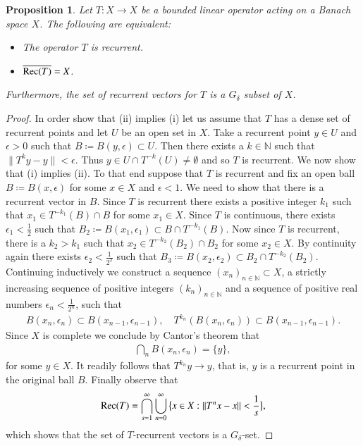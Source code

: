 \documentclass[12pt,leqno]{amsart}
\theoremstyle{plain}
\newtheorem{proposition}[equation]{Proposition}
\theoremstyle{definition}
\numberwithin{equation}{section}
\begin{document}
\begin{proposition}
	\label{p.dense} Let $T:X\to X$ be a bounded linear operator acting on a Banach space $X$. The following are equivalent: 
	\begin{itemize}
		\item [(i)] The operator $T$ is recurrent. 
		\item [(ii)] $\overline{{\textnormal{Rec}}(T)}=X$. 
	\end{itemize}
	Furthermore, the set of recurrent vectors for $T$ is a $G_\delta$ subset of $X$. 
\end{proposition}
\begin{proof}
	In order show that (ii) implies (i) let us assume that $T$ has a dense set of recurrent points and let $U$ be an open set in $X$. Take a recurrent point $y\in U$ and $\epsilon>0$ such that $B\coloneqq B(y,\epsilon)\subset U$. Then there exists a $k\in{\mathbb N}$ such that $\| T^ky-y\|<\epsilon$. Thus $y\in U\cap T^{-k} (U)\neq \emptyset$ and so $T$ is recurrent. We now show that (i) implies (ii). To that end suppose that $T$ is recurrent and fix an open ball $B\coloneqq B(x,\epsilon)$ for some $x\in X$ and $\epsilon<1$. We need to show that there is a recurrent vector in $B$. Since $T$ is recurrent there exists a positive integer $k_1$ such that $x_1\in T^{-k_1}(B)\cap B$ for some $x_1\in X$. Since $T$ is continuous, there exists $\epsilon_1<\frac{1}{2}$ such that $B_2\coloneqq B(x_1,\epsilon_1)\subset B \cap T^{-k_1}(B)$. Now since $T$ is recurrent, there is a $k_2>k_1$ such that $x_2\in T^{-k_2}(B_2)\cap B_2$ for some $x_2\in X$. By continuity again there exists $\epsilon_2<\frac{1}{2^2}$ such that $B_3\coloneqq B(x_2,\epsilon_2)\subset B_2 \cap T^{-k_2}(B_2)$. Continuing inductively we construct a sequence $(x_n)_{n\in\mathbb N}\subset X$, a strictly increasing sequence of positive integers $(k_n)_{n\in\mathbb N}$ and a sequence of positive real numbers $\epsilon_n<\frac{1}{2^n}$, such that 
	\begin{align*}
		B(x_n,\epsilon_n)\subset B(x_{n-1},\epsilon_{n-1}), \quad T^{k_n}(B(x_n,\epsilon_n))\subset B(x_{n-1},\epsilon_{n-1}). 
	\end{align*}
	Since $X$ is complete we conclude by Cantor's theorem that 
	\begin{align*}
		\bigcap_n B(x_n,\epsilon_n)=\{y\}, 
	\end{align*}
	for some $y\in X$. It readily follows that $T^{k_n}y\rightarrow y$, that is, $y$ is a recurrent point in the original ball $B$. Finally observe that 
	\begin{align*}
		\textnormal{\textnormal{Rec}}(T)=\bigcap_{s=1} ^{\infty} \bigcup_{n=0} ^{\infty}\big \{ x\in X:\|T^n x -x \| <\frac{1}{s} \big\}, 
	\end{align*}
	which shows that the set of $T$-recurrent vectors is a $G_\delta$-set. 
\end{proof}
\end{document}
